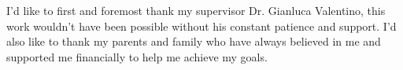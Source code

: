 \begin{acknowledgements}
I'd like to first and foremost thank my supervisor Dr. Gianluca Valentino, this work wouldn't have been possible without his constant patience and support. I'd also like to thank my parents and family who have always believed in me and supported me financially to help me achieve my goals.
\end{acknowledgements}